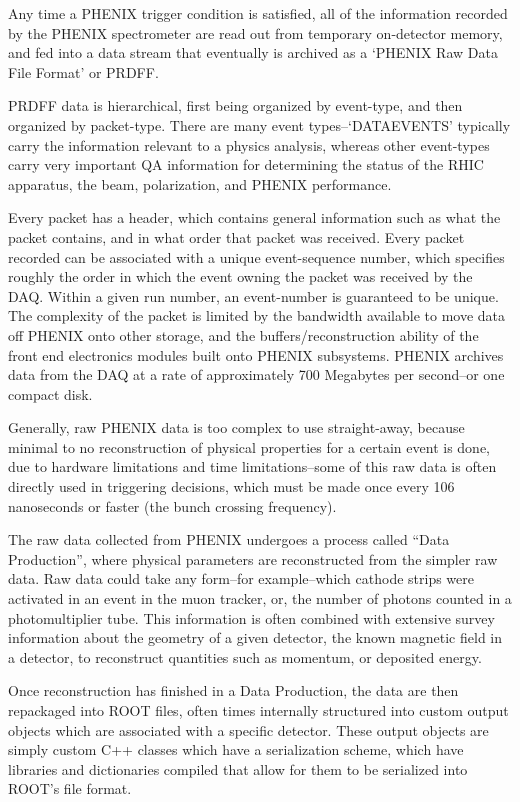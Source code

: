 Any time a PHENIX trigger condition is satisfied, all of the information
recorded by the PHENIX spectrometer are read out from temporary on-detector
memory, and fed into a data stream that eventually is archived as a `PHENIX Raw
Data File Format' or PRDFF. 

PRDFF data is hierarchical, first being organized by event-type, and
then organized by packet-type.  There are many event types--`DATAEVENTS'
typically carry the information relevant to a physics analysis, whereas other
event-types carry very important QA information for determining the status of
the RHIC apparatus, the beam, polarization, and PHENIX performance.

Every packet has a header, which contains general information such as what the
packet contains, and in what order that packet was received. Every packet
recorded can be associated with a unique event-sequence number, which specifies
roughly the order in which the event owning the packet was received by the DAQ.
Within a given run number, an event-number is guaranteed to be unique. The
complexity of the packet is limited by the bandwidth available to move data off
PHENIX onto other storage, and the buffers/reconstruction ability of the front
end electronics modules built onto PHENIX subsystems. PHENIX archives data from
the DAQ at a rate of approximately 700 Megabytes per second--or one compact
disk.

Generally, raw PHENIX data is too complex to use straight-away, because minimal
to no reconstruction of physical properties for a certain event is done, due to
hardware limitations and time limitations--some of this raw data is often
directly used in triggering decisions, which must be made once every 106
nanoseconds or faster (the bunch crossing frequency).

The raw data collected from PHENIX undergoes a process called ``Data
Production'', where physical parameters are reconstructed from the simpler raw
data. Raw data could take any form--for example--which cathode strips were
activated in an event in the muon tracker, or, the number of photons counted in
a photomultiplier tube. This information is often combined with extensive survey
information about the geometry of a given detector, the known magnetic field in
a detector, to reconstruct quantities such as momentum, or deposited energy.

Once reconstruction has finished in a Data Production, the data are then
repackaged into ROOT files, often times internally structured into custom output
objects which are associated with a specific detector. These output objects are
simply custom C++ classes which have a serialization scheme, which have
libraries and dictionaries compiled that allow for them to be serialized into
ROOT's file format.

